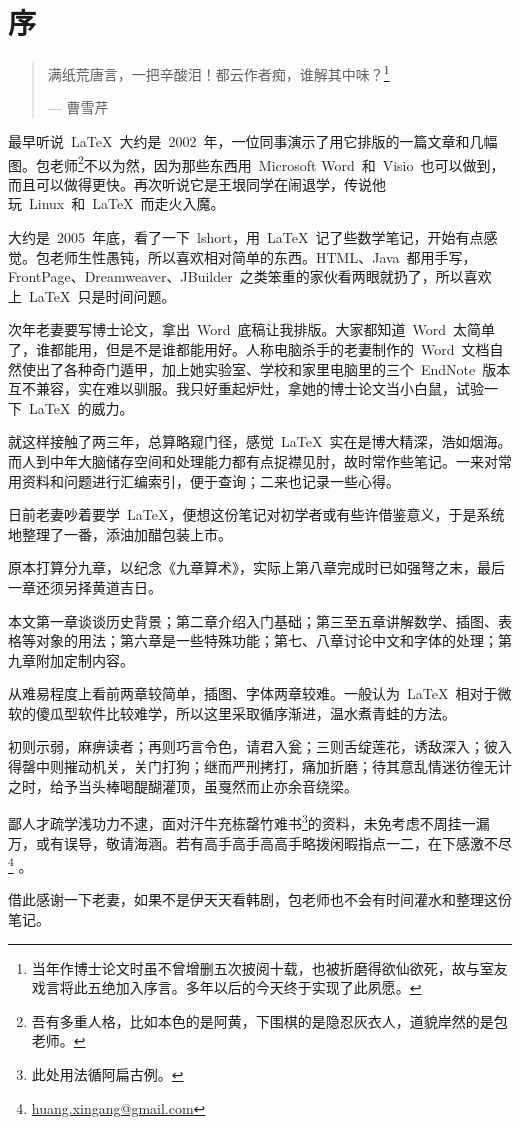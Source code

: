 \chapter{序}

\begin{quotation}
满纸荒唐言，一把辛酸泪！都云作者痴，谁解其中味？\footnote{当年作博士论文时虽不曾增删五次披阅十载，也被折磨得欲仙欲死，故与室友戏言将此五绝加入序言。多年以后的今天终于实现了此夙愿。}
\begin{flushright}
--- 曹雪芹
\end{flushright}
\end{quotation}

最早听说~\LaTeX~大约是~2002~年，一位同事演示了用它排版的一篇文章和几幅图。包老师\footnote{吾有多重人格，比如本色的是阿黄，下围棋的是隐忍灰衣人，道貌岸然的是包老师。}不以为然，因为那些东西用~Microsoft Word~和~Visio~也可以做到，而且可以做得更快。再次听说它是王垠同学在闹退学，传说他玩~Linux~和~\LaTeX~而走火入魔。

大约是~2005~年底，看了一下~lshort，用~\LaTeX~记了些数学笔记，开始有点感觉。包老师生性愚钝，所以喜欢相对简单的东西。HTML、Java~都用手写，FrontPage、Dreamweaver、JBuilder~之类笨重的家伙看两眼就扔了，所以喜欢上~\LaTeX~只是时间问题。

次年老妻要写博士论文，拿出~Word~底稿让我排版。大家都知道~Word~太简单了，谁都能用，但是不是谁都能用好。人称电脑杀手的老妻制作的~Word~文档自然使出了各种奇门遁甲，加上她实验室、学校和家里电脑里的三个~EndNote~版本互不兼容，实在难以驯服。我只好重起炉灶，拿她的博士论文当小白鼠，试验一下~\LaTeX~的威力。

就这样接触了两三年，总算略窥门径，感觉~\LaTeX~实在是博大精深，浩如烟海。而人到中年大脑储存空间和处理能力都有点捉襟见肘，故时常作些笔记。一来对常用资料和问题进行汇编索引，便于查询；二来也记录一些心得。

日前老妻吵着要学~\LaTeX，便想这份笔记对初学者或有些许借鉴意义，于是系统地整理了一番，添油加醋包装上市。

原本打算分九章，以纪念《九章算术》，实际上第八章完成时已如强弩之末，最后一章还须另择黄道吉日。

本文第一章谈谈历史背景；第二章介绍入门基础；第三至五章讲解数学、插图、表格等对象的用法；第六章是一些特殊功能；第七、八章讨论中文和字体的处理；第九章附加定制内容。

从难易程度上看前两章较简单，插图、字体两章较难。一般认为~\LaTeX~相对于微软的傻瓜型软件比较难学，所以这里采取循序渐进，温水煮青蛙的方法。

初则示弱，麻痹读者；再则巧言令色，请君入瓮；三则舌绽莲花，诱敌深入；彼入得罄中则摧动机关，关门打狗；继而严刑拷打，痛加折磨；待其意乱情迷彷徨无计之时，给予当头棒喝醍醐灌顶，虽戛然而止亦余音绕梁。

鄙人才疏学浅功力不逮，面对汗牛充栋罄竹难书\footnote{此处用法循阿扁古例。}的资料，未免考虑不周挂一漏万，或有误导，敬请海涵。若有高手高手高高手略拨闲暇指点一二，在下感激不尽\footnote{\href{mailto:huang.xingang@gmail.com}{huang.xingang@gmail.com}}
。

借此感谢一下老妻，如果不是伊天天看韩剧，包老师也不会有时间灌水和整理这份笔记。
